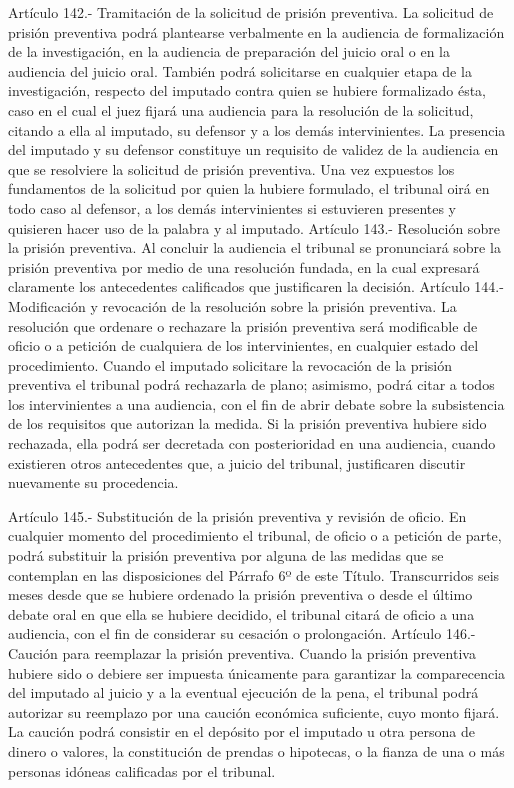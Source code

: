     Artículo 142.- Tramitación de la solicitud de prisión preventiva. La solicitud de prisión preventiva podrá plantearse verbalmente en la audiencia de formalización de la investigación, en la audiencia de preparación del juicio oral o en la audiencia del juicio oral.
    También podrá solicitarse en cualquier etapa de la investigación, respecto del imputado contra quien se hubiere formalizado ésta, caso en el cual el juez fijará una audiencia para la resolución de la solicitud, citando a ella al imputado, su defensor y a los demás intervinientes.
    La presencia del imputado y su defensor constituye un requisito de validez de la audiencia en que se resolviere la solicitud de prisión preventiva.
    Una vez expuestos los fundamentos de la solicitud por quien la hubiere formulado, el tribunal oirá en todo caso al defensor, a los demás intervinientes si estuvieren presentes y quisieren hacer uso de la palabra y al imputado.
    Artículo 143.- Resolución sobre la prisión preventiva. Al concluir la audiencia el tribunal se pronunciará sobre la prisión preventiva por medio de una resolución fundada, en la cual expresará claramente los antecedentes calificados que justificaren la decisión.
    Artículo 144.- Modificación y revocación de la resolución sobre la prisión preventiva. La resolución que ordenare o rechazare la prisión preventiva será modificable de oficio o a petición de cualquiera de los intervinientes, en cualquier estado del procedimiento.
    Cuando el imputado solicitare la revocación de la prisión preventiva el tribunal podrá rechazarla de plano; asimismo, podrá citar a todos los intervinientes a una audiencia, con el fin de abrir debate sobre la subsistencia de los requisitos que autorizan la medida.
    Si la prisión preventiva hubiere sido rechazada, ella podrá ser decretada con posterioridad en una audiencia, cuando existieren otros antecedentes que, a juicio del tribunal, justificaren discutir nuevamente su procedencia.



    Artículo 145.- Substitución de la prisión preventiva y revisión de oficio. En cualquier momento del procedimiento el tribunal, de oficio o a petición de parte, podrá substituir la prisión preventiva por alguna de las medidas que se contemplan en las disposiciones del Párrafo 6º de este Título.
    Transcurridos seis meses desde que se hubiere ordenado la prisión preventiva o desde el último debate oral en que ella se hubiere decidido, el tribunal citará de oficio a una audiencia, con el fin de considerar su cesación o prolongación.
    Artículo 146.- Caución para reemplazar la prisión preventiva. Cuando la prisión preventiva hubiere sido o debiere ser impuesta únicamente para garantizar la comparecencia del imputado al juicio y a la eventual ejecución de la pena, el tribunal podrá autorizar su reemplazo por una caución económica suficiente, cuyo monto fijará.
    La caución podrá consistir en el depósito por el imputado u otra persona de dinero o valores, la constitución de prendas o hipotecas, o la fianza de una o más personas idóneas calificadas por el tribunal.

